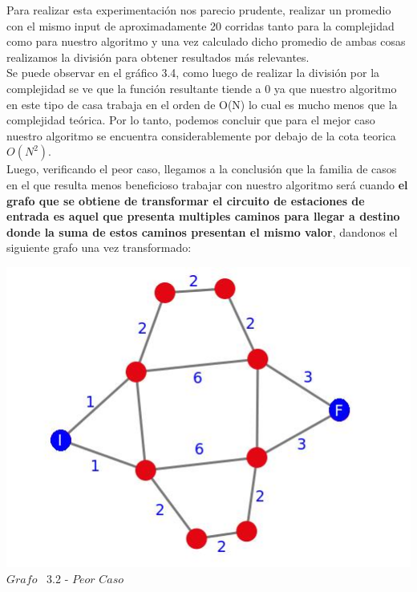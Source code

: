 Para realizar esta experimentaci\'on nos parecio prudente, realizar un promedio con el mismo input de aproximadamente 20 corridas
tanto para la complejidad como para nuestro algoritmo y una vez calculado dicho promedio de ambas cosas realizamos la divisi\'on para
obtener resultados m\'as relevantes.\\ 

Se puede observar en el gr\'afico 3.4, como luego de realizar la divisi\'on por la complejidad se ve que la funci\'on resultante tiende a 0 ya que nuestro algoritmo en este tipo de casa trabaja en el orden de O(N) lo cual es mucho menos que la complejidad te\'orica. Por lo tanto, podemos concluir que para el mejor caso nuestro algoritmo se encuentra considerablemente por debajo de la cota teorica $O(N^2)$.\\

Luego, verificando el peor caso, llegamos a la conclusi\'on que la familia de casos en el que resulta menos beneficioso trabajar con nuestro algoritmo ser\'a cuando \textbf{el grafo que se obtiene de transformar el circuito de estaciones de entrada es aquel que presenta multiples caminos para llegar a destino donde la suma de estos caminos presentan el mismo valor}, dandonos el siguiente grafo una vez transformado:\\


\vspace*{0.3cm} \vspace*{0.3cm}
  \begin{center}
 \includegraphics[scale=0.5]{./EJ3/grafoMultiCamino.jpeg}
 \\{$Grafo$ \ 3.2 - $Peor$ $Caso$}
  \end{center}
  \vspace*{0.3cm}
  

